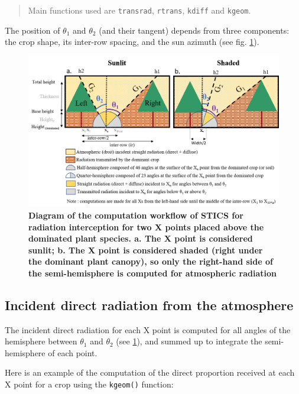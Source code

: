 \documentclass[]{book}
\theoremstyle{definition}
\theoremstyle{definition}
\theoremstyle{definition}
\theoremstyle{remark}
\begin{document}
\begin{quote}
Main functions used are \texttt{transrad}, \texttt{rtrans},
\texttt{kdiff} and \texttt{kgeom}.
\end{quote}

The position of \(\theta_1\) and \(\theta_2\) (and their tangent)
depends from three components: the crop shape, its inter-row spacing,
and the sun azimuth (see fig. \ref{fig:Compdominated}).

\begin{figure}
\centering
\includegraphics{img/Light-interception-dominated.png}
\caption{\label{fig:Compdominated}\textbf{Diagram of the computation
workflow of STICS for radiation interception for two X points placed
above the dominated plant species. a. The X point is considered sunlit;
b. The X point is considered shaded (right under the dominant plant
canopy), so only the right-hand side of the semi-hemisphere is computed
for atmospheric radiation}}
\end{figure}

\subsection{Incident direct radiation from the
atmosphere}\label{incident-direct-radiation-from-the-atmosphere}

The incident direct radiation for each X point is computed for all
angles of the hemisphere between \(\theta_1\) and \(\theta_2\) (see
\ref{fig:Compdominated}), and summed up to integrate the semi-hemisphere
of each point.

Here is an example of the computation of the direct proportion received
at each X point for a crop using the \texttt{kgeom()} function:
\end{document}
